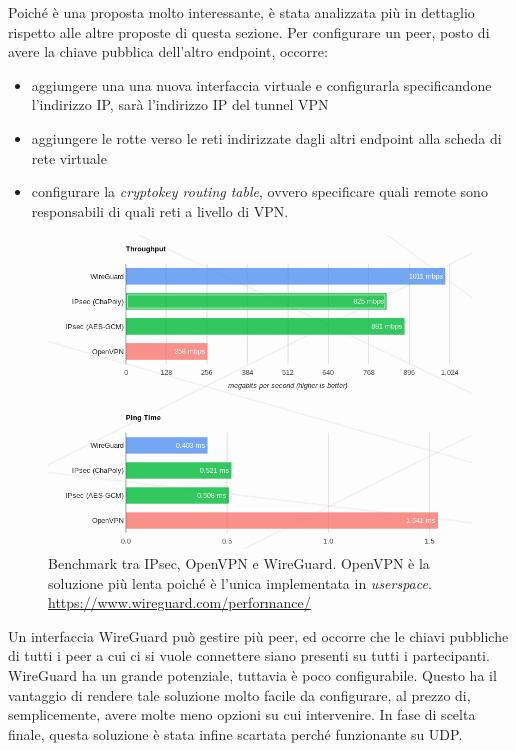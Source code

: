 	      
Poiché è una proposta molto interessante, è stata analizzata più in dettaglio rispetto
alle altre proposte di questa sezione. Per configurare un peer,
posto di avere la chiave pubblica dell'altro endpoint, occorre:
\begin{itemize}
	\item aggiungere una una nuova interfaccia virtuale e configurarla specificandone
	      l'indirizzo IP, sarà l'indirizzo IP del tunnel VPN
	\item aggiungere le rotte verso le reti indirizzate dagli altri endpoint alla scheda
	      di rete virtuale
	\item configurare la \textit{cryptokey routing table}, ovvero specificare
	      quali remote sono responsabili di quali reti a livello di VPN\cite{wireguard-quick-start}.
\end{itemize}
\begin{figure}
	\includegraphics[scale=0.45]{img/wireguard_performance}
	\caption[Benchmark tra IPsec, OpenVPN e WireGuard]{Benchmark tra IPsec, OpenVPN e WireGuard.
		OpenVPN è la soluzione più lenta poiché è l'unica implementata in \textit{userspace}.
		\url{https://www.wireguard.com/performance/}}
	\label{fig:wireguard-performance}
\end{figure}
Un interfaccia WireGuard può gestire più peer, ed occorre che le chiavi pubbliche di tutti
i peer a cui ci si vuole connettere siano presenti su tutti i partecipanti.
WireGuard ha un grande potenziale, tuttavia è poco configurabile. Questo ha il vantaggio
di rendere tale soluzione molto facile da configurare, al prezzo di, semplicemente, avere
molte meno opzioni su cui intervenire. In fase di scelta
finale, questa soluzione è stata infine scartata perché funzionante su UDP.
	      
